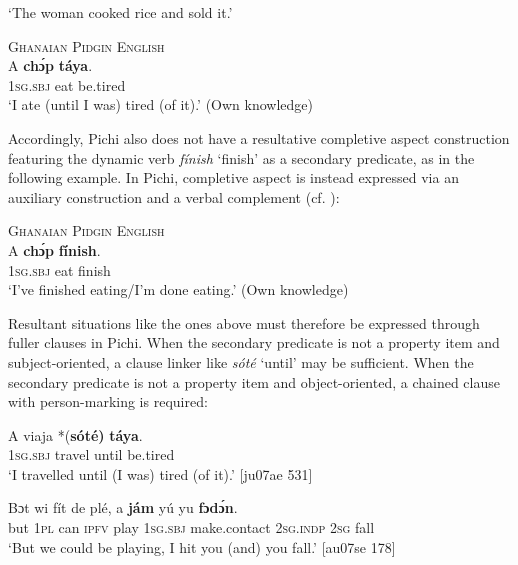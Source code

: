 \glt ‘The woman cooked rice and sold it.’ \citep[72]{Finney2004}
\z


\ea%
    \label{ex:key:1607}
\textsc{Ghanaian Pidgin English}\\
    \gll A    \textbf{chɔ́p}  \textbf{táya}.\\
\textsc{1sg.sbj}  eat    be.tired  \\

\glt ‘I ate (until I was) tired (of it).’ (Own knowledge)
\z

Accordingly, Pichi also does not have a resultative completive aspect construction featuring the dynamic verb \textit{fínish} ‘finish’ as a secondary predicate, as in the following example. In Pichi, completive aspect is instead expressed via an auxiliary construction and a verbal complement (cf. ):


\ea%
    \label{ex:key:1608}
\textsc{Ghanaian Pidgin English}\\
    \gll A    \textbf{chɔ́p}  \textbf{fínish}.\\
\textsc{1sg.sbj}  eat    finish  \\

\glt ‘I’ve finished eating/I’m done eating.’ (Own knowledge)
\z

Resultant situations like the ones above must therefore be expressed through fuller clauses in Pichi. When the secondary predicate is not a property item and subject-oriented, a clause linker like \textit{sóté} ‘until’ may be sufficient. When the secondary predicate is not a property item and object-oriented, a chained clause with person-marking is required:


\ea%
    \label{ex:key:1609}
    \gll A    viaja  *(\textbf{sóté}\textbf{\textmd{)}}  \textbf{táya}.\\
\textsc{1sg.sbj}  travel   \phantom{*(}until  be.tired\\

\glt ‘I travelled until (I was) tired (of it).’ [ju07ae 531]
\z


\ea%
    \label{ex:key:1610}
    \gll Bɔt  wi  fít  de  plé,  a    \textbf{jám}        yú    yu  \textbf{fɔdɔ́n}.\\
but  \textsc{1pl}  can  \textsc{ipfv}  play  \textsc{1sg.sbj}  make.contact    \textsc{2sg.indp}  \textsc{2sg}  fall\\

\glt ‘But we could be playing, I hit you (and) you fall.’ [au07se 178]
\z

